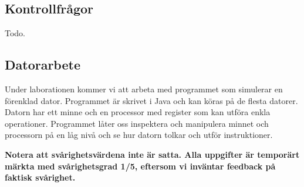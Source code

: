 \subsection*{Kontrollfrågor}
\begin{Kontrollfragor}
    \item Todo.
\end{Kontrollfragor}

% 

\clearpage
\subsection*{Datorarbete}
Under laborationen kommer vi att arbeta med programmet \progname{} som simulerar en förenklad dator. Programmet är skrivet i Java och kan köras på de flesta datorer. Datorn har ett minne och en processor med register som kan utföra enkla operationer. Programmet låter oss inspektera och manipulera minnet och processorn på en låg nivå och se hur datorn tolkar och utför instruktioner.

\halfblankline
\noindent\textbf{Notera att svårighetsvärdena inte är satta. Alla uppgifter är temporärt märkta med svårighetsgrad 1/5, eftersom vi inväntar feedback på faktisk svårighet.}

